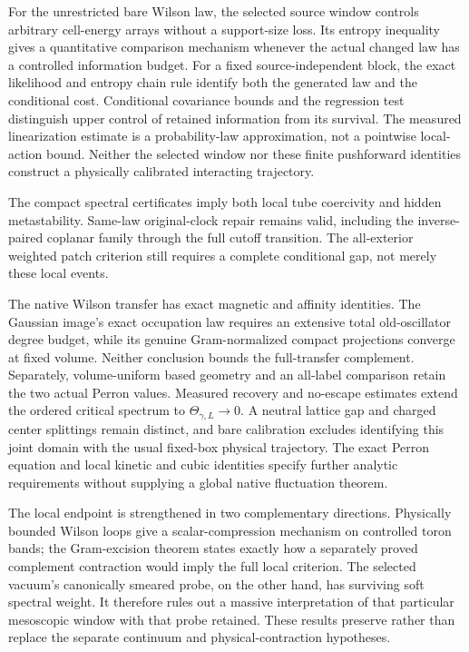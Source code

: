 \documentclass[11pt,oneside,openany]{book}
\theoremstyle{definition}
\theoremstyle{remark}
\begin{document}
For the unrestricted bare Wilson law, the selected source window
controls arbitrary cell-energy arrays without a support-size loss.
Its entropy inequality gives a quantitative comparison mechanism
whenever the actual changed law has a controlled information budget.
For a fixed source-independent block, the exact likelihood and entropy
chain rule identify both the generated law and the conditional cost.
Conditional covariance bounds and the regression test distinguish
upper control of retained information from its survival. The measured
linearization estimate is a probability-law approximation, not a
pointwise local-action bound. Neither the selected window nor these
finite pushforward identities construct a physically calibrated
interacting trajectory.

The compact spectral certificates imply both local tube coercivity
and hidden metastability. Same-law original-clock repair remains
valid, including the inverse-paired coplanar family through the full
cutoff transition. The all-exterior weighted patch criterion still
requires a complete conditional gap, not merely these local events.

The native Wilson transfer has exact magnetic and affinity identities.
The Gaussian image's exact occupation law requires an extensive total
old-oscillator degree budget, while its genuine Gram-normalized
compact projections converge at fixed volume. Neither conclusion
bounds the full-transfer complement. Separately, volume-uniform based
geometry and an all-label comparison retain the two actual Perron
values. Measured recovery and no-escape
estimates extend the ordered critical spectrum to
$\Theta_{\gamma,L}\to0$. A neutral lattice gap and charged center
splittings remain distinct, and bare calibration excludes identifying
this joint domain with the usual fixed-box physical trajectory.
The exact Perron equation and local kinetic and cubic identities
specify further analytic requirements without supplying a global
native fluctuation theorem.

The local endpoint is strengthened in two complementary directions.
Physically bounded Wilson loops give a scalar-compression mechanism
on controlled toron bands; the Gram-excision theorem states exactly
how a separately proved complement contraction would imply the full
local criterion. The selected vacuum's canonically smeared probe,
on the other hand, has surviving soft spectral weight. It therefore
rules out a massive interpretation of that particular mesoscopic
window with that probe retained. These results preserve rather than
replace the separate continuum and physical-contraction hypotheses.
\end{document}
